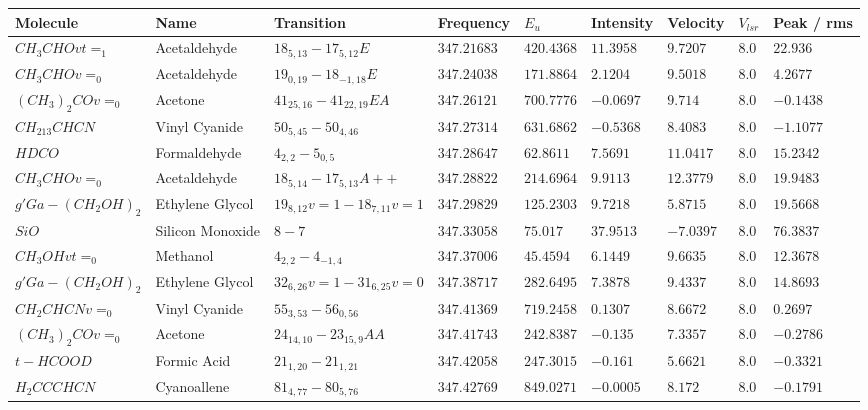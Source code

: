 \documentclass[10pt]{article}
\begin{document}
\begin{table}[htb]
\small
    \centering    
    \begin{tabular}{l l l l l l l l l} 
\hline
Molecule & Name & Transition & Frequency & $E_{{u}}$ & Intensity & Velocity & $V_{{lsr}}$ & Peak / rms \\
\hline
$CH_{3}CHOvt=_{1}$ & Acetaldehyde & $18_{5,13}-17_{5,12}E$ & $347.21683$ & $420.4368$ & $11.3958$ & $9.7207$ & $8.0$ & $22.936$\\
$CH_{3}CHOv=_{0}$ & Acetaldehyde & $19_{0,19}-18_{-1,18}E$ & $347.24038$ & $171.8864$ & $2.1204$ & $9.5018$ & $8.0$ & $4.2677$\\
$(CH_{3})_{2}COv=_{0}$ & Acetone & $41_{25,16}-41_{22,19}EA$ & $347.26121$ & $700.7776$ & $-0.0697$ & $9.714$ & $8.0$ & $-0.1438$\\
$CH_{213}CHCN$ & Vinyl Cyanide & $50_{5,45}-50_{4,46}$ & $347.27314$ & $631.6862$ & $-0.5368$ & $8.4083$ & $8.0$ & $-1.1077$\\
$HDCO$ & Formaldehyde & $4_{2,2}-5_{0,5}$ & $347.28647$ & $62.8611$ & $7.5691$ & $11.0417$ & $8.0$ & $15.2342$\\
$CH_{3}CHOv=_{0}$ & Acetaldehyde & $18_{5,14}-17_{5,13}A++$ & $347.28822$ & $214.6964$ & $9.9113$ & $12.3779$ & $8.0$ & $19.9483$\\
$g'Ga-(CH_{2}OH)_{2}$ & Ethylene Glycol & $19_{8,12}v=1-18_{7,11}v=1$ & $347.29829$ & $125.2303$ & $9.7218$ & $5.8715$ & $8.0$ & $19.5668$\\
$SiO$ & Silicon Monoxide & $8-7$ & $347.33058$ & $75.017$ & $37.9513$ & $-7.0397$ & $8.0$ & $76.3837$\\
$CH_{3}OHvt=_{0}$ & Methanol & $4_{2,2}-4_{-1,4}$ & $347.37006$ & $45.4594$ & $6.1449$ & $9.6635$ & $8.0$ & $12.3678$\\
$g'Ga-(CH_{2}OH)_{2}$ & Ethylene Glycol & $32_{6,26}v=1-31_{6,25}v=0$ & $347.38717$ & $282.6495$ & $7.3878$ & $9.4337$ & $8.0$ & $14.8693$\\
$CH_{2}CHCNv=_{0}$ & Vinyl Cyanide & $55_{3,53}-56_{0,56}$ & $347.41369$ & $719.2458$ & $0.1307$ & $8.6672$ & $8.0$ & $0.2697$\\
$(CH_{3})_{2}COv=_{0}$ & Acetone & $24_{14,10}-23_{15,9}AA$ & $347.41743$ & $242.8387$ & $-0.135$ & $7.3357$ & $8.0$ & $-0.2786$\\
$t-HCOOD$ & Formic Acid & $21_{1,20}-21_{1,21}$ & $347.42058$ & $247.3015$ & $-0.161$ & $5.6621$ & $8.0$ & $-0.3321$\\
$H_{2}CCCHCN$ & Cyanoallene & $81_{4,77}-80_{5,76}$ & $347.42769$ & $849.0271$ & $-0.0005$ & $8.172$ & $8.0$ & $-0.1791$\\
\hline




    \end{tabular}
\end{table}
\end{document}
